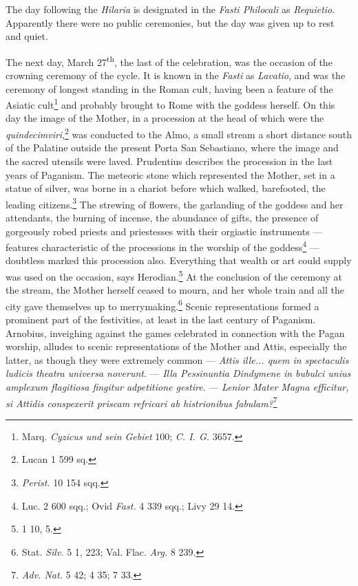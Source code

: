 \documentclass[a4paper, 11pt, oneside, polutonikogreek, french]{article}
\begin{document}
The day following the \emph{Hilaria} is designated in the \emph{Fasti Philocali} as \emph{Requietio}. Apparently there were no public ceremonies, but the day was given up to rest and quiet.

The next day, March 27\textsuperscript{th}, the last of the celebration, was the occasion of the crowning ceremony of the cycle. It is known in the \emph{Fasti} as \emph{Lavatio}, and was the ceremony of longest standing in the Roman cult, having been a feature of the Asiatic cult\footnote{Marq. \emph{Cyzicus und sein Gebiet} 100; \emph{C. I. G.} 3657.} and probably brought to Rome with the goddess herself. On this day the image of the Mother, in a procession at the head of which were the \emph{quindecimviri},\footnote{Lucan 1 599 sq.} was conducted to the Almo, a small stream a short distance south of the Palatine outside the present Porta San Sebastiano, where the image and the sacred utensils were laved. Prudentius describes the procession in the last years of Paganism. The meteoric stone which represented the Mother, set in a statue of silver, was borne in a chariot before which walked, barefooted, the leading citizens.\footnote{\emph{Perist.} 10 154 sqq.} The strewing of flowers, the garlanding of the goddess and her attendants, the burning of incense, the abundance of gifts, the presence of gorgeously robed priests and priestesses with their orgiastic instruments --- features characteristic of the processions in the worship of the goddess\footnote{Luc. 2 600 sqq.; Ovid \emph{Fast.} 4 339 sqq.; Livy 29 14.} --- doubtless marked this procession also. Everything that wealth or art could supply was used on the occasion, says Herodian.\footnote{1 10, 5.} At the conclusion of the ceremony at the stream, the Mother herself ceased to mourn, and her whole train and all the city gave themselves up to merrymaking.\footnote{Stat. \emph{Silv.} 5 1, 223; Val. Flac. \emph{Arg.} 8 239.} Scenic representations formed a prominent part of the festivities, at least in the last century of Paganism. Arnobius, inveighing against the games celebrated in connection with the Pagan worship, alludes to scenic representations of the Mother and Attis, especially the latter, as though they were extremely common --- \emph{Attis ille... quem in spectaculis ludicis theatra universa noverunt}. --- \emph{Illa Pessinuntia Dindymene in bubulci unius amplexum flagitiosa fingitur adpetitione gestire}. --- \emph{Lenior Mater Magna efficitur, si Attidis conspexerit priscam refricari ab histrionibus fabulam?}\footnote{\emph{Adv. Nat.} 5 42; 4 35; 7 33.}
\end{document}
